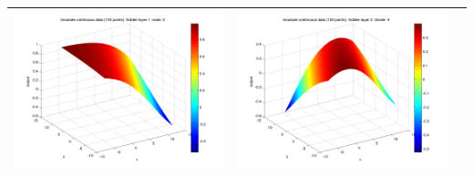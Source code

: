 \documentclass[fleqn]{article}
\begin{document}
\begin{center}
\begin{longtable}{ c | c | r }
    \includegraphics[scale=0.25]{./pics/bivariate100/_2_4/_2_4_epoch_Inf_hidden layer 1 :2} &   \includegraphics[scale=0.25]{./pics/bivariate100/_2_4/_2_4_epoch_Inf_hidden layer 2 :24} & \\
   \hline
  \end{longtable}
\end{center}
\end{document}
